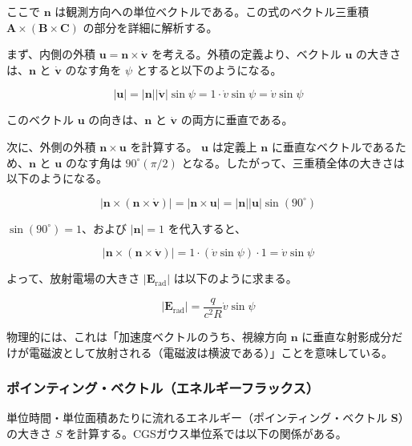 \documentclass[a4paper,11pt]{bxjsarticle} %
\begin{document}
ここで $\bm{n}$ は観測方向への単位ベクトルである。この式のベクトル三重積 $\bm{A} \times (\bm{B} \times \bm{C})$ の部分を詳細に解析する。

まず、内側の外積 $\bm{u} = \bm{n} \times \dot{\bm{v}}$ を考える。外積の定義より、ベクトル $\bm{u}$ の大きさは、$\bm{n}$ と $\dot{\bm{v}}$ のなす角を $\psi$ とすると以下のようになる。

\begin{equation}
    |\bm{u}| = |\bm{n}| |\dot{\bm{v}}| \sin\psi = 1 \cdot \dot{v} \sin\psi = \dot{v} \sin\psi
\end{equation}

このベクトル $\bm{u}$ の向きは、$\bm{n}$ と $\dot{\bm{v}}$ の両方に垂直である。

次に、外側の外積 $\bm{n} \times \bm{u}$ を計算する。
$\bm{u}$ は定義上 $\bm{n}$ に垂直なベクトルであるため、$\bm{n}$ と $\bm{u}$ のなす角は $90^\circ (\pi/2)$ となる。したがって、三重積全体の大きさは以下のようになる。

\begin{equation}
    |\bm{n} \times (\bm{n} \times \dot{\bm{v}})| = |\bm{n} \times \bm{u}| = |\bm{n}| |\bm{u}| \sin(90^\circ)
\end{equation}

$\sin(90^\circ)=1$、および $|\bm{n}|=1$ を代入すると、

\begin{equation}
    |\bm{n} \times (\bm{n} \times \dot{\bm{v}})| = 1 \cdot (\dot{v} \sin\psi) \cdot 1 = \dot{v} \sin\psi
\end{equation}

よって、放射電場の大きさ $|\bm{E}_{\mathrm{rad}}|$ は以下のように求まる。

\begin{equation}
    |\bm{E}_{\mathrm{rad}}| = \frac{q}{c^2 R} \dot{v} \sin\psi
\end{equation}

物理的には、これは「加速度ベクトルのうち、視線方向 $\bm{n}$ に垂直な射影成分だけが電磁波として放射される（電磁波は横波である）」ことを意味している。

\subsubsection{ポインティング・ベクトル（エネルギーフラックス）}

単位時間・単位面積あたりに流れるエネルギー（ポインティング・ベクトル $\bm{S}$）の大きさ $S$ を計算する。CGSガウス単位系では以下の関係がある。
\end{document}
